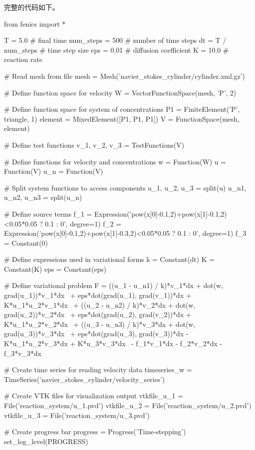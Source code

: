 完整的代码如下。

\begin{python}
from fenics import *

T = 5.0            # final time
num_steps = 500    # number of time steps
dt = T / num_steps # time step size
eps = 0.01         # diffusion coefficient
K = 10.0           # reaction rate

# Read mesh from file
mesh = Mesh('navier_stokes_cylinder/cylinder.xml.gz')

# Define function space for velocity
W = VectorFunctionSpace(mesh, 'P', 2)

# Define function space for system of concentrations
P1 = FiniteElement('P', triangle, 1)
element = MixedElement([P1, P1, P1])
V = FunctionSpace(mesh, element)

# Define test functions
v_1, v_2, v_3 = TestFunctions(V)

# Define functions for velocity and concentrations
w = Function(W)
u = Function(V)
u_n = Function(V)

# Split system functions to access components
u_1, u_2, u_3 = split(u)
u_n1, u_n2, u_n3 = split(u_n)

# Define source terms
f_1 = Expression('pow(x[0]-0.1,2)+pow(x[1]-0.1,2)<0.05*0.05 ? 0.1 : 0',
                 degree=1)
f_2 = Expression('pow(x[0]-0.1,2)+pow(x[1]-0.3,2)<0.05*0.05 ? 0.1 : 0',
                 degree=1)
f_3 = Constant(0)

# Define expressions used in variational forms
k = Constant(dt)
K = Constant(K)
eps = Constant(eps)

# Define variational problem
F = ((u_1 - u_n1) / k)*v_1*dx + dot(w, grad(u_1))*v_1*dx \
  + eps*dot(grad(u_1), grad(v_1))*dx + K*u_1*u_2*v_1*dx  \
  + ((u_2 - u_n2) / k)*v_2*dx + dot(w, grad(u_2))*v_2*dx \
  + eps*dot(grad(u_2), grad(v_2))*dx + K*u_1*u_2*v_2*dx  \
  + ((u_3 - u_n3) / k)*v_3*dx + dot(w, grad(u_3))*v_3*dx \
  + eps*dot(grad(u_3), grad(v_3))*dx - K*u_1*u_2*v_3*dx + K*u_3*v_3*dx \
  - f_1*v_1*dx - f_2*v_2*dx - f_3*v_3*dx

# Create time series for reading velocity data
timeseries_w = TimeSeries('navier_stokes_cylinder/velocity_series')

# Create VTK files for visualization output
vtkfile_u_1 = File('reaction_system/u_1.pvd')
vtkfile_u_2 = File('reaction_system/u_2.pvd')
vtkfile_u_3 = File('reaction_system/u_3.pvd')

# Create progress bar
progress = Progress('Time-stepping')
set_log_level(PROGRESS)


\end{python}

